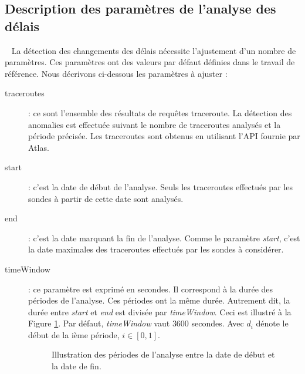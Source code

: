 \subsection{Description des paramètres de l'analyse des délais} \label{par:parametre-de-lanalyse}~
La détection des changements des délais nécessite l'ajustement d'un nombre de paramètres. Ces paramètres ont des valeurs par défaut  définies dans le travail de référence. 
Nous décrivons ci-dessous les paramètres à ajuster :
\begin{description}
	\item[traceroutes] : ce sont l'ensemble des résultats de requêtes traceroute. La détection des anomalies est effectuée suivant le nombre de traceroutes analysés et la période précisée. Les  traceroutes sont obtenus en utilisant l'API fournie par Atlas.
	\item[start] : c'est la date de début de l'analyse. Seuls les traceroutes effectués par les sondes  à partir de cette date sont analysés.
\item[end]  : c'est la date marquant la fin de l'analyse. Comme le paramètre \textit{start}, c'est la date maximales des  traceroutes effectués par les sondes  à considérer.
\item[timeWindow]:  ce paramètre est exprimé en secondes. Il correspond à la durée des périodes de l'analyse. Ces périodes ont la même durée. Autrement dit, la durée entre   \textit{start} et \textit{end} est divisée par \textit{timeWindow}. Ceci est illustré à la Figure  \ref{fig:timing_tex}. Par défaut, \textit{timeWindow} vaut $ 3600 $ secondes. Avec $d_i$ dénote le début de la ième période,  $i \in [0,1]$.
\begin{figure}[h]
	\centering
	\captionsetup{justification=centering}
	
	\caption{Illustration des périodes de l'analyse entre la date de début et la date de fin.}
	\label{fig:timing_tex}
\end{figure}
%		 

\end{description}
